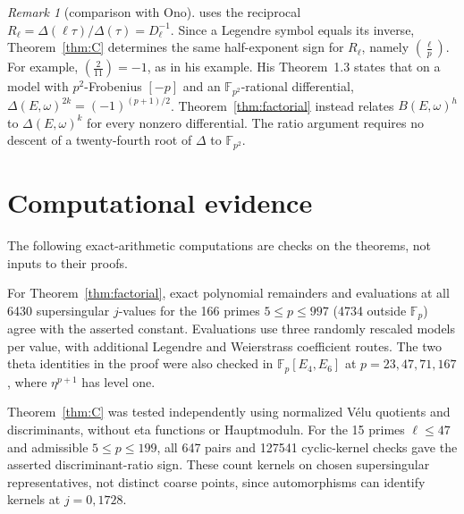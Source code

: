 \documentclass[11pt,a4paper]{article}
\numberwithin{equation}{section}
\theoremstyle{definition}
\theoremstyle{remark}
\newtheorem{remark}[theorem]{Remark}
\newcommand{\Fp}{\mathbb F_p}
\newcommand{\Fq}{\mathbb F_{p^2}}
\newcommand{\leg}[2]{\left(\frac{#1}{#2}\right)}
\newcommand{\Lp}[1]{\left(\frac{#1}{p}\right)}
\begin{document}
\begin{remark}[comparison with Ono]\label{rem:ono}
\citet[Theorem~1.2 and Remark~4]{Ono25} uses the reciprocal
$R_\ell=\Delta(\ell\tau)/\Delta(\tau)=D_\ell^{-1}$.
Since a Legendre symbol equals its inverse, Theorem~\ref{thm:C}
determines the same half-exponent sign for $R_\ell$, namely $\Lp\ell$.
For example, $\leg2{11}=-1$, as in his example.
His Theorem~1.3 states that on a model with $p^2$-Frobenius $[-p]$
and an $\Fq$-rational differential,
$\Delta(E,\omega)^{2k}=(-1)^{(p+1)/2}$.
Theorem~\ref{thm:factorial} instead relates $B(E,\omega)^h$ to
$\Delta(E,\omega)^k$ for every nonzero differential.
The ratio argument requires no descent of a twenty-fourth root of
$\Delta$ to $\Fq$.
\end{remark}

\section{Computational evidence}\label{sec:comp}
The following exact-arithmetic computations are checks on the theorems,
not inputs to their proofs.

For Theorem~\ref{thm:factorial}, exact polynomial remainders and evaluations
at all 6430 supersingular $j$-values for the 166 primes $5\le p\le997$
(4734 outside $\Fp$) agree with the asserted constant. Evaluations use three
randomly rescaled models per value, with additional Legendre and Weierstrass
coefficient routes.
The two theta identities in the proof were also checked in
$\Fp[E_4,E_6]$ at $p=23,47,71,167$, where $\eta^{p+1}$ has level one.

Theorem~\ref{thm:C} was tested independently using normalized
V\'elu quotients and discriminants, without eta functions or Hauptmoduln.
For the 15 primes $\ell\le47$ and admissible $5\le p\le199$, all 647 pairs
and 127541 cyclic-kernel checks gave the asserted discriminant-ratio sign.
These count kernels on chosen supersingular representatives, not distinct
coarse points, since automorphisms can identify kernels at $j=0,1728$.
\end{document}
